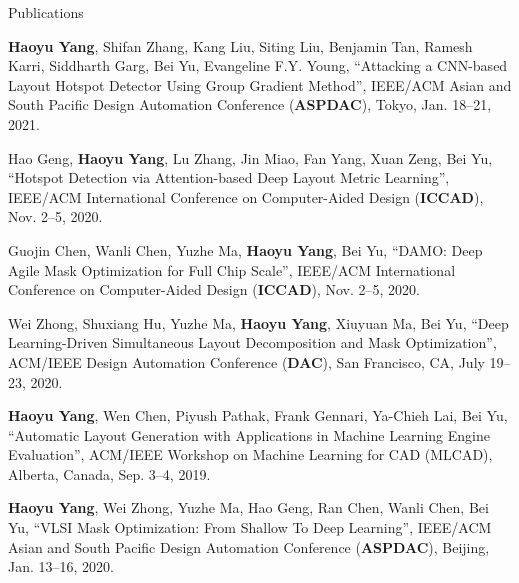 \begin{rSection}{Publications}
\begin{description}[font=\normalfont]
	\item[{[C18]}] \textbf{Haoyu Yang}, Shifan Zhang, Kang Liu, Siting Liu, Benjamin Tan, Ramesh Karri, Siddharth Garg, Bei Yu, Evangeline F.Y. Young,
	``Attacking a CNN-based Layout Hotspot Detector Using Group Gradient Method'', 
	IEEE/ACM Asian and South Pacific Design Automation Conference (\textbf{ASPDAC}), Tokyo, Jan. 18–21, 2021.

    \item[{[C17]}] Hao Geng, \textbf{Haoyu Yang}, Lu Zhang, Jin Miao, Fan Yang, Xuan Zeng, Bei Yu, 
    ``Hotspot Detection via Attention-based Deep Layout Metric Learning'', 
    IEEE/ACM International Conference on Computer-Aided Design (\textbf{ICCAD}), Nov. 2–5, 2020.
    
    \item[{[C16]}] Guojin Chen, Wanli Chen, Yuzhe Ma, \textbf{Haoyu Yang}, Bei Yu,
     ``DAMO: Deep Agile Mask Optimization for Full Chip Scale'', 
     IEEE/ACM International Conference on Computer-Aided Design (\textbf{ICCAD}), Nov. 2–5, 2020.
	
	\item[{[C15]}] Wei Zhong, Shuxiang Hu, Yuzhe Ma, \textbf{Haoyu Yang}, Xiuyuan Ma, Bei Yu, 
	``Deep Learning-Driven Simultaneous Layout Decomposition and Mask Optimization'', 
	ACM/IEEE Design Automation Conference (\textbf{DAC}), San Francisco, CA, July 19–23, 2020.
	
	\item[{[C14]}] \textbf{Haoyu Yang}, Wen Chen, Piyush Pathak, Frank Gennari, Ya-Chieh Lai, Bei Yu, 
	``Automatic Layout Generation with Applications in Machine Learning Engine Evaluation'', 
	ACM/IEEE Workshop on Machine Learning for CAD (MLCAD), Alberta, Canada, Sep. 3–4, 2019.
	
	
	\item[{[C13]}] \textbf{Haoyu Yang}, Wei Zhong, Yuzhe Ma, Hao Geng, Ran Chen, Wanli Chen, Bei Yu,
	 ``VLSI Mask Optimization: From Shallow To Deep Learning'', 
	 IEEE/ACM Asian and South Pacific Design Automation Conference (\textbf{ASPDAC}), Beijing, Jan. 13–16, 2020.


\end{description}
\end{rSection}
